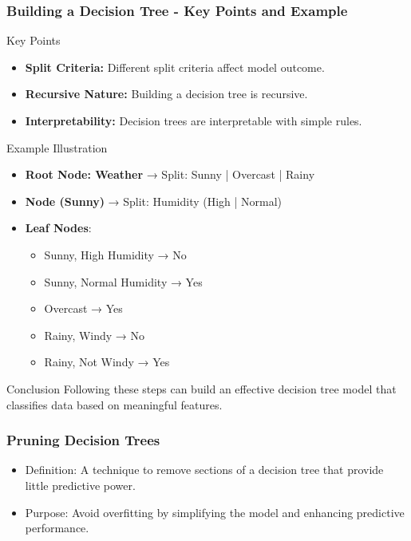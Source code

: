 \documentclass[aspectratio=169]{beamer}
\begin{document}
\begin{frame}[fragile]
    \frametitle{Building a Decision Tree - Key Points and Example}
    \begin{block}{Key Points}
        \begin{itemize}
            \item \textbf{Split Criteria:} Different split criteria affect model outcome.
            \item \textbf{Recursive Nature:} Building a decision tree is recursive.
            \item \textbf{Interpretability:} Decision trees are interpretable with simple rules.
        \end{itemize}
    \end{block}
    
    \begin{block}{Example Illustration}
        \begin{itemize}
            \item \textbf{Root Node: Weather} → Split: Sunny | Overcast | Rainy 
            \item \textbf{Node (Sunny)} → Split: Humidity (High | Normal) 
            \item \textbf{Leaf Nodes}: 
                \begin{itemize}
                    \item Sunny, High Humidity → No
                    \item Sunny, Normal Humidity → Yes
                    \item Overcast → Yes
                    \item Rainy, Windy → No
                    \item Rainy, Not Windy → Yes
                \end{itemize}
        \end{itemize}
    \end{block}
    
    \begin{block}{Conclusion}
        Following these steps can build an effective decision tree model that classifies data based on meaningful features.
    \end{block}
\end{frame}

\begin{frame}[fragile]
    \frametitle{Pruning Decision Trees}
    \begin{itemize}
        \item Definition: A technique to remove sections of a decision tree that provide little predictive power.
        \item Purpose: Avoid overfitting by simplifying the model and enhancing predictive performance.
    \end{itemize}
\end{frame}
\end{document}
